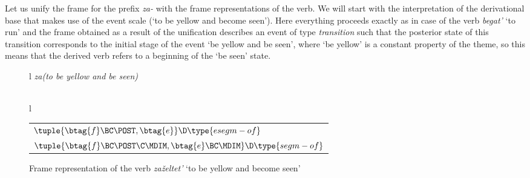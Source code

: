 Let us unify the frame for the prefix \textit{za-} with the frame representations of the verb. We will start with the interpretation of the derivational base that makes use of the event scale (`to be yellow and become seen'). Here everything proceeds exactly as in case of the verb \textit{begat'} `to run' and the frame obtained as a result of the unification describes an event of type \textit{transition} such that the posterior state of this transition corresponds to the initial stage of the event `be yellow and be seen', where `be yellow' is a constant property of the theme, so this means that the derived verb refers to a beginning of the `be seen' state.

\begin{figure}
\begin{tabular}[t]{l}
\textit{za(to be yellow and be seen)}\\
\\
\end{tabular}
\begin{footnotesize}
\begin{tabular}[t]{l}
\\
\end{tabular}
\end{footnotesize}
\vspace{0.2em}
\begin{tabular}[t]{l}
$\tuple{\btag{f}\BC\POST,\btag{e}}\D\type{esegm-of}$\\[1ex]
$\tuple{\btag{f}\BC\POST\C\MDIM,\btag{e}\BC\MDIM}\D\type{segm-of}$\\
\end{tabular}
\caption{Frame representation of the verb \textit{za\v{z}eltet'} `to be yellow and become seen' \label{frame:zazeltet:seen}}
\end{figure}

